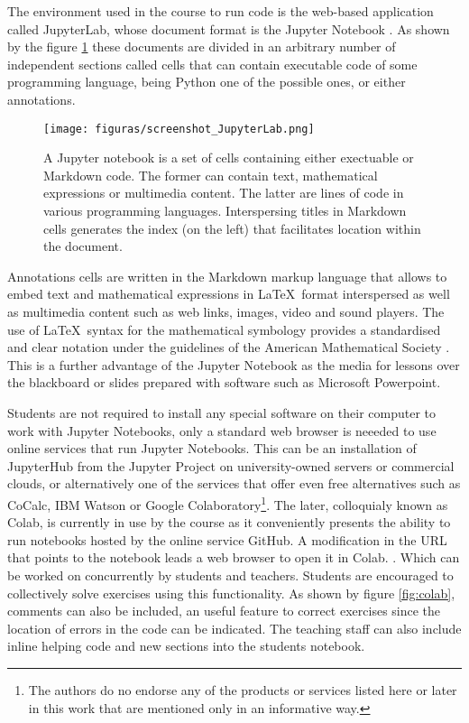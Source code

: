 
The environment used in the course to run code is the web-based application called JupyterLab, whose document format is the Jupyter Notebook \cite{Kluyver2016jupyter}.
As shown by the figure \ref{fig:jupyter} these documents are divided in an arbitrary number of independent sections called cells that can contain executable code of some programming language, being Python one of the possible ones, or either annotations.

\begin{figure}[!ht]
	\centering
	\texttt{[image: figuras/screenshot\_JupyterLab.png]}
	\caption{
		A Jupyter notebook is a set of cells
        containing either exectuable or Markdown code.
		The former can contain text, mathematical expressions or multimedia content.
		The latter are lines of code in various programming languages.
		Interspersing titles in Markdown cells generates the index (on the left) that facilitates location within the document.
	}
	\label{fig:jupyter}
\end{figure}

Annotations cells are written in the Markdown markup language \cite{markdown} that allows to embed text and mathematical expressions in \LaTeX\ format interspersed as well as multimedia content such as web links, images, video and sound players.
The use of \LaTeX\ syntax for the mathematical symbology provides a standardised and clear notation under the guidelines of the American Mathematical Society \cite{ams}. 
This is a further advantage of the Jupyter Notebook as the media for lessons over the blackboard or slides prepared with software such as Microsoft Powerpoint.


Students are not required to install any special software on their computer to work with Jupyter Notebooks, only a standard web browser is neeeded to use online services that run Jupyter Notebooks.
This can be an installation of JupyterHub from the Jupyter Project on university-owned servers or commercial clouds, or alternatively one of the services that offer even free alternatives such as CoCalc, IBM Watson or Google Colaboratory\footnote{The authors do no endorse any of the products or services listed here or later in this work that are mentioned only in an informative way.}.
The later, colloquialy known as Colab, is currently in use by the course as it conveniently presents the ability to run notebooks hosted by the online service GitHub.  
A modification in the URL that points to the notebook leads a web browser to open it in Colab. \cite{vallejo_google_2022,google_llc_using_2021}.
Which can be worked on concurrently by students and teachers.
Students are encouraged to collectively solve exercises using this functionality.
As shown by figure \ref{fig:colab}, comments can also be included, an useful feature to correct exercises since the location of errors in the code can be indicated.
The teaching staff can also include inline helping code and new sections into the students notebook.

